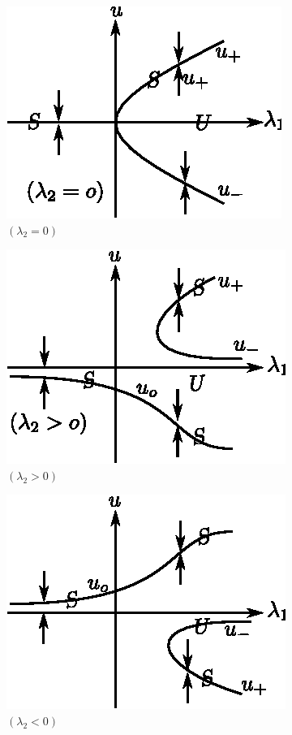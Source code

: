 \begin{center}
\begin{minipage}[c]{5cm}
\begin{figure}[H]
\centering
\includegraphics[scale=.95]{vol79-fig/fig1.9.eps}
\smallskip
\caption{$(\lambda_2 =0)$}
\label{chap1-sec1.2-fig1.9}
\end{figure}
\end{minipage}
\qquad
\begin{minipage}[c]{5cm}
\begin{figure}[H]
\centering
\includegraphics[scale=.95]{vol79-fig/fig1.10.eps}
\smallskip
\caption{$(\lambda_2 > 0)$}
\label{chap1-sec1.2-fig1.10}
\end{figure}
\end{minipage}
\end{center}\pageoriginale

\begin{figure}[H]
\centering 
\includegraphics[scale=.95]{vol79-fig/fig79-11.eps}
\smallskip
\caption{$(\lambda_{2}<0)$}
\label{chap1-sec1.2-fig1.11}
\end{figure}

